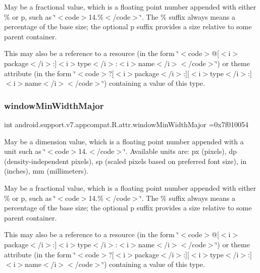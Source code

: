 May be a fractional value, which is a floating point number appended with either \% or p, such as \char`\"{}$<$code$>$14.\%$<$/code$>$\char`\"{}. The \% suffix always means a percentage of the base size; the optional p suffix provides a size relative to some parent container. 

This may also be a reference to a resource (in the form \char`\"{}$<$code$>$@\mbox{[}$<$i$>$package$<$/i$>$\+:\mbox{]}$<$i$>$type$<$/i$>$\+:$<$i$>$name$<$/i$>$$<$/code$>$\char`\"{}) or theme attribute (in the form \char`\"{}$<$code$>$?\mbox{[}$<$i$>$package$<$/i$>$\+:\mbox{]}\mbox{[}$<$i$>$type$<$/i$>$\+:\mbox{]}$<$i$>$name$<$/i$>$$<$/code$>$\char`\"{}) containing a value of this type. \mbox{\label{classandroid_1_1support_1_1v7_1_1appcompat_1_1R_1_1attr_aeb051e893d3a1293b81a53d5f8eecc36}} 
\subsubsection{\texorpdfstring{window\+Min\+Width\+Major}{windowMinWidthMajor}}
{\footnotesize\ttfamily int android.\+support.\+v7.\+appcompat.\+R.\+attr.\+window\+Min\+Width\+Major =0x7f010054\hspace{0.3cm}{\ttfamily [static]}}

May be a dimension value, which is a floating point number appended with a unit such as \char`\"{}$<$code$>$14.\+5sp$<$/code$>$\char`\"{}. Available units are\+: px (pixels), dp (density-\/independent pixels), sp (scaled pixels based on preferred font size), in (inches), mm (millimeters). 

May be a fractional value, which is a floating point number appended with either \% or p, such as \char`\"{}$<$code$>$14.\%$<$/code$>$\char`\"{}. The \% suffix always means a percentage of the base size; the optional p suffix provides a size relative to some parent container. 

This may also be a reference to a resource (in the form \char`\"{}$<$code$>$@\mbox{[}$<$i$>$package$<$/i$>$\+:\mbox{]}$<$i$>$type$<$/i$>$\+:$<$i$>$name$<$/i$>$$<$/code$>$\char`\"{}) or theme attribute (in the form \char`\"{}$<$code$>$?\mbox{[}$<$i$>$package$<$/i$>$\+:\mbox{]}\mbox{[}$<$i$>$type$<$/i$>$\+:\mbox{]}$<$i$>$name$<$/i$>$$<$/code$>$\char`\"{}) containing a value of this type. \mbox{\label{classandroid_1_1support_1_1v7_1_1appcompat_1_1R_1_1attr_a44efbb3ecb10ad7ef826badb3c6342ac}} 
